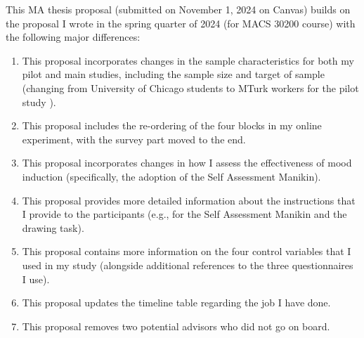 \documentclass{article}
\begin{document}
This MA thesis proposal (submitted on November 1, 2024 on Canvas) builds on the proposal I wrote in the spring quarter of 2024 (for MACS 30200 course) with the following major differences:
\begin{enumerate}
    \item This proposal incorporates changes in the sample characteristics for both my pilot and main studies, including the sample size and target of sample (changing from University of Chicago students to MTurk workers for the pilot study ).
    \item This proposal includes the re-ordering of the four blocks in my online experiment, with the survey part moved to the end. 
    \item This proposal incorporates changes in how I assess the effectiveness of mood induction (specifically, the adoption of the Self Assessment Manikin).
    \item This proposal provides more detailed information about the instructions that I provide to the participants (e.g., for the Self Assessment Manikin and the drawing task). 
    \item This proposal contains more information on the four control variables that I used in my study (alongside additional references to the three questionnaires I use). 
    \item This proposal updates the timeline table regarding the job I have done. 
    \item This proposal removes two potential advisors who did not go on board. 
\end{enumerate}
\end{document}
